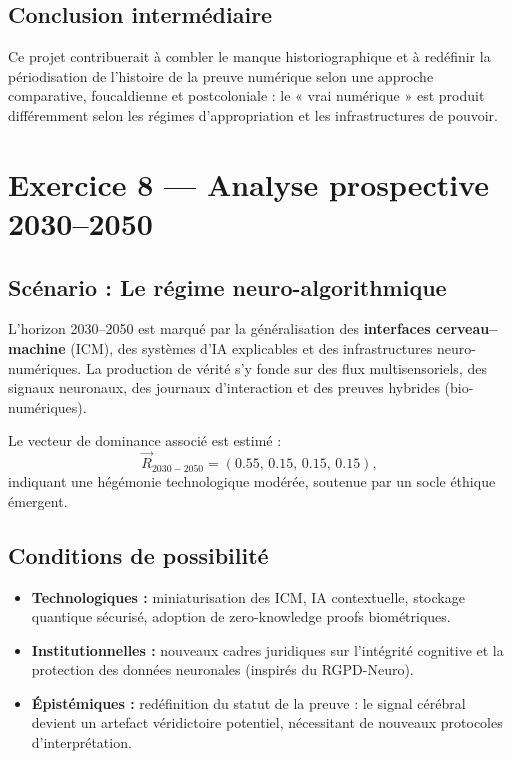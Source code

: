 \documentclass[memoire, 12pt]{report}
\begin{document}
\subsection*{Conclusion intermédiaire}
Ce projet contribuerait à combler le manque historiographique et à redéfinir la périodisation de l’histoire de la preuve numérique selon une approche comparative, foucaldienne et postcoloniale : le « vrai numérique » est produit différemment selon les régimes d’appropriation et les infrastructures de pouvoir.

\bigskip

\section{Exercice 8 — Analyse prospective 2030--2050}

\subsection*{Scénario : Le régime neuro-algorithmique}
L’horizon 2030--2050 est marqué par la généralisation des \textbf{interfaces cerveau–machine} (ICM), des systèmes d’IA explicables et des infrastructures neuro-numériques.  
La production de vérité s’y fonde sur des flux multisensoriels, des signaux neuronaux, des journaux d’interaction et des preuves hybrides (bio-numériques).  

Le vecteur de dominance associé est estimé :
\[
\vec{R}_{2030-2050} = (0.55,\,0.15,\,0.15,\,0.15),
\]
indiquant une hégémonie technologique modérée, soutenue par un socle éthique émergent.

\subsection*{Conditions de possibilité}
\begin{itemize}
  \item \textbf{Technologiques :} miniaturisation des ICM, IA contextuelle, stockage quantique sécurisé, adoption de zero-knowledge proofs biométriques.
  \item \textbf{Institutionnelles :} nouveaux cadres juridiques sur l’intégrité cognitive et la protection des données neuronales (inspirés du RGPD-Neuro).
  \item \textbf{Épistémiques :} redéfinition du statut de la preuve : le signal cérébral devient un artefact véridictoire potentiel, nécessitant de nouveaux protocoles d’interprétation.
\end{itemize}
\end{document}
